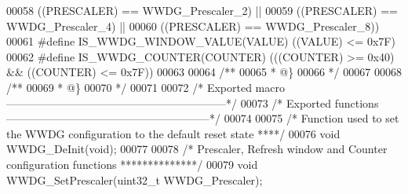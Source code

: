 \begin{DoxyCode}
00058                                       \textcolor{preprocessor}{(}\textcolor{preprocessor}{(}\textcolor{preprocessor}{PRESCALER}\textcolor{preprocessor}{)} \textcolor{preprocessor}{==} WWDG_Prescaler_2\textcolor{preprocessor}{)} \textcolor{preprocessor}{||}
00059                                       \textcolor{preprocessor}{(}\textcolor{preprocessor}{(}\textcolor{preprocessor}{PRESCALER}\textcolor{preprocessor}{)} \textcolor{preprocessor}{==} WWDG_Prescaler_4\textcolor{preprocessor}{)} \textcolor{preprocessor}{||}
00060                                       \textcolor{preprocessor}{(}\textcolor{preprocessor}{(}\textcolor{preprocessor}{PRESCALER}\textcolor{preprocessor}{)} \textcolor{preprocessor}{==} WWDG_Prescaler_8\textcolor{preprocessor}{)}\textcolor{preprocessor}{)}
00061 \textcolor{preprocessor}{#}\textcolor{preprocessor}{define} \textcolor{preprocessor}{IS\_WWDG\_WINDOW\_VALUE}\textcolor{preprocessor}{(}\textcolor{preprocessor}{VALUE}\textcolor{preprocessor}{)} \textcolor{preprocessor}{(}\textcolor{preprocessor}{(}\textcolor{preprocessor}{VALUE}\textcolor{preprocessor}{)} \textcolor{preprocessor}{<=} 0x7F\textcolor{preprocessor}{)}
00062 \textcolor{preprocessor}{#}\textcolor{preprocessor}{define} \textcolor{preprocessor}{IS\_WWDG\_COUNTER}\textcolor{preprocessor}{(}\textcolor{preprocessor}{COUNTER}\textcolor{preprocessor}{)} \textcolor{preprocessor}{(}\textcolor{preprocessor}{(}\textcolor{preprocessor}{(}\textcolor{preprocessor}{COUNTER}\textcolor{preprocessor}{)} \textcolor{preprocessor}{>=} 0x40\textcolor{preprocessor}{)} \textcolor{preprocessor}{&&} \textcolor{preprocessor}{(}\textcolor{preprocessor}{(}\textcolor{preprocessor}{COUNTER}\textcolor{preprocessor}{)} \textcolor{preprocessor}{<=} 0x7F\textcolor{preprocessor}{)}\textcolor{preprocessor}{)}
00063 
00064 \textcolor{comment}{/**}
00065 \textcolor{comment}{  * @\}}
00066 \textcolor{comment}{  */}
00067 
00068 \textcolor{comment}{/**}
00069 \textcolor{comment}{  * @\}}
00070 \textcolor{comment}{  */}
00071 
00072 \textcolor{comment}{/* Exported macro ------------------------------------------------------------*/}
00073 \textcolor{comment}{/* Exported functions --------------------------------------------------------*/}
00074 
00075 \textcolor{comment}{/*  Function used to set the WWDG configuration to the default reset state ****/}
00076 \textcolor{keywordtype}{void} WWDG_DeInit(\textcolor{keywordtype}{void});
00077 
00078 \textcolor{comment}{/* Prescaler, Refresh window and Counter configuration functions **************/}
00079 \textcolor{keywordtype}{void} WWDG_SetPrescaler(uint32\_t WWDG\_Prescaler);

\end{DoxyCode}
